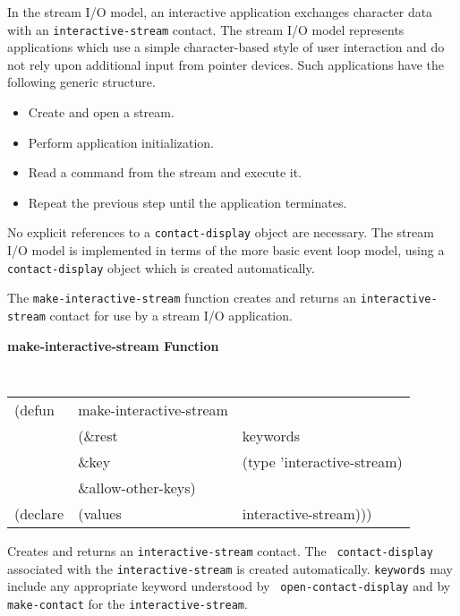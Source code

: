 \documentclass[twoside]{book}
\begin{document}
\begin{sloppy}
In the stream I/O model, an interactive application exchanges character data
with an {\tt interactive-stream} contact. 
The stream I/O model represents applications which use a simple character-based
style of user interaction and do not rely upon additional input from
pointer devices. Such applications have the following generic structure.
\begin{itemize}
\item Create and open a stream.
\item Perform application initialization.
\item Read a command from the stream and execute it. 
\item Repeat the previous step until the
application terminates.
\end{itemize}
No explicit references to a {\tt contact-display} object are necessary. The
stream I/O model is implemented in terms of the more basic event loop model,
using a {\tt contact-display} object which is created automatically. 

The {\tt make-interactive-stream} function creates and returns an {\tt interactive-stream} contact for
use by a stream I/O application.

{\samepage
{\large {\bf make-interactive-stream \hfill Function}} 
\begin{flushright} \parbox[t]{6.125in}{
\tt
\begin{tabular}{lll}
\raggedright
(defun & make-interactive-stream & \\ 
& (\&rest & keywords\\
&\&key & (type 'interactive-stream)\\
&\&allow-other-keys) \\
(declare &(values  & interactive-stream))) 
\end{tabular}
\rm

}\end{flushright}}

\begin{flushright} \parbox[t]{6.125in}{
Creates and returns an {\tt interactive-stream} contact. The {\tt
contact-display} associated with the {\tt interactive-stream} is created
automatically. {\tt keywords} may include any appropriate
keyword understood by {\tt
open-contact-display}
and by {\tt make-contact} 
for the {\tt interactive-stream}.

}
\end{flushright}
\end{sloppy}
\end{document}
